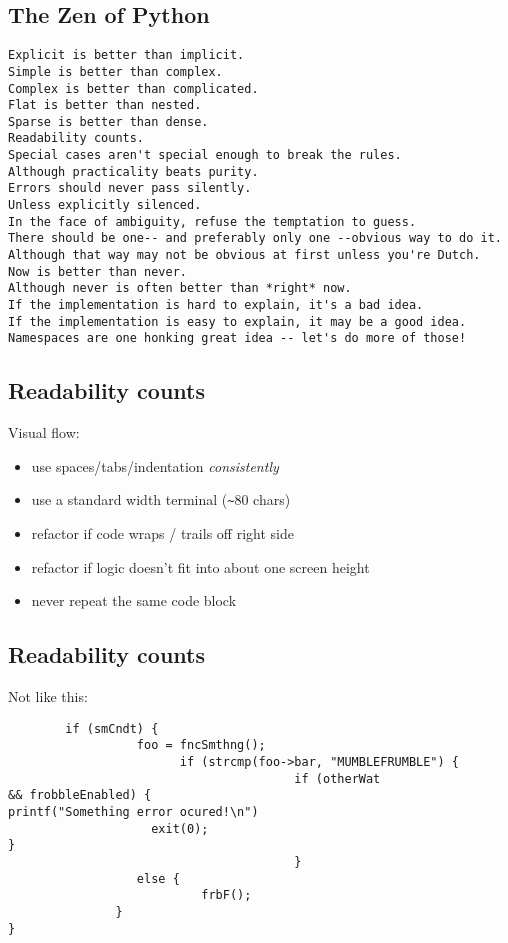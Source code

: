 \documentclass[xga]{xdvislides}
\begin{document}
\subsection{The Zen of Python}
\smallish
\begin{verbatim}
Explicit is better than implicit.
Simple is better than complex.
Complex is better than complicated.
Flat is better than nested.
Sparse is better than dense.
Readability counts.
Special cases aren't special enough to break the rules.
Although practicality beats purity.
Errors should never pass silently.
Unless explicitly silenced.
In the face of ambiguity, refuse the temptation to guess.
There should be one-- and preferably only one --obvious way to do it.
Although that way may not be obvious at first unless you're Dutch.
Now is better than never.
Although never is often better than *right* now.
If the implementation is hard to explain, it's a bad idea.
If the implementation is easy to explain, it may be a good idea.
Namespaces are one honking great idea -- let's do more of those!
\end{verbatim}
\Normalsize

\subsection{Readability counts}
Visual flow:
\begin{itemize}
	\item use spaces/tabs/indentation {\em consistently}
	\item use a standard width terminal (\verb+~+80 chars)
	\item refactor if code wraps / trails off right side
	\item refactor if logic doesn't fit into about one screen height
	\item never repeat the same code block
\end{itemize}

\subsection{Readability counts}
Not like this:
\begin{verbatim}
        if (smCndt) {
                  foo = fncSmthng();
                        if (strcmp(foo->bar, "MUMBLEFRUMBLE") {
                                        if (otherWat
&& frobbleEnabled) {
printf("Something error ocured!\n")
                    exit(0);
}
                                        }
                  else {
                           frbF();
               }
}
\end{verbatim}
\end{document}
